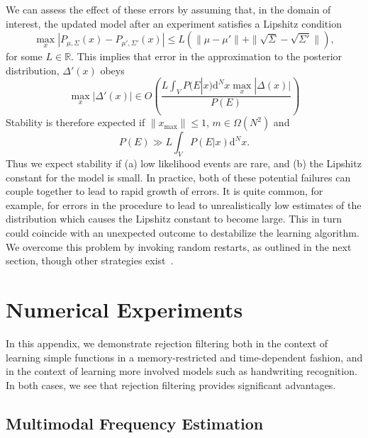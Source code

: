 \documentclass{article} %
\begin{document}
We can assess the effect of these errors by assuming that, in the domain of interest, the updated model after an experiment satisfies a Lipshitz condition
\begin{equation}
\max_x|P_{\mu,\Sigma}(x) - P_{\mu' ,\Sigma'}(x)| \le L(\|\mu- \mu'\| +\|\sqrt{\Sigma}- \sqrt{\Sigma'}\|),
\end{equation}
for some $L\in \mathbb{R}$.  This implies that error in the approximation to the posterior distribution, $\Delta'(x)$ obeys
\begin{equation}
\max_x |\Delta'(x)| \in O\left( \frac{L\int_V P(E|x) \mathrm{d}^Nx \max_x |\Delta(x)|}{P(E)}\right)
\end{equation}
Stability is therefore expected if $\|x_{\max}\|\le 1$, $m\in \Omega(N^2)$ and
\begin{equation}
P(E) \gg {L\int_V P(E|x) \mathrm{d}^Nx }.
\end{equation}
Thus we expect stability if (a) low likelihood events are rare, and (b) the Lipshitz constant for the model is small.  In practice, both of these potential failures can couple together to lead to rapid growth of errors.  It is quite common, for example, for errors in the procedure to lead to unrealistically low estimates of the distribution which causes the Lipshitz constant to become large.  This in turn could coincide with an unexpected outcome to destabilize the learning algorithm. 
We overcome this problem by invoking random restarts, as outlined in the next section,
though other strategies exist~\cite{wiebe_efficient_2015}.


\section{Numerical Experiments}
\label{app:numerical-experiments}

In this appendix, we demonstrate rejection filtering both in the context of
learning simple functions in a memory-restricted and time-dependent fashion,
and in the context of learning more involved models such as handwriting
recognition. In both cases, we see that rejection filtering provides significant
advantages.

\subsection{Multimodal Frequency Estimation}
\end{document}
